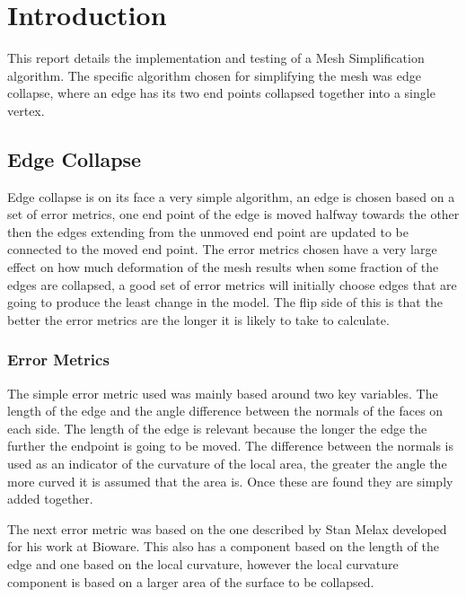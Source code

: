 \chapter{Introduction}

  This report details the implementation and testing of a Mesh Simplification
  algorithm.  The specific algorithm chosen for simplifying the mesh was edge
  collapse, where an edge has its two end points collapsed together into a
  single vertex.

  \section{Edge Collapse}

    Edge collapse is on its face a very simple algorithm, an edge is chosen
    based on a set of error metrics, one end point of the edge is moved halfway
    towards the other then the edges extending from the unmoved end point are
    updated to be connected to the moved end point.  The error metrics chosen
    have a very large effect on how much deformation of the mesh results when
    some fraction of the edges are collapsed, a good set of error metrics will
    initially choose edges that are going to produce the least change in the
    model.  The flip side of this is that the better the error metrics are the
    longer it is likely to take to calculate.

    \subsection{Error Metrics}

      The simple error metric used was mainly based around two key variables.
      The length of the edge and the angle difference between the normals of the
      faces on each side.  The length of the edge is relevant because the longer
      the edge the further the endpoint is going to be moved.  The difference
      between the normals is used as an indicator of the curvature of the local
      area, the greater the angle the more curved it is assumed that the area
      is.  Once these are found they are simply added together.

      The next error metric was based on the one described by Stan Melax
      \cite{smelax} developed for his work at Bioware.  This also has a
      component based on the length of the edge and one based on the local
      curvature, however the local curvature component is based on a larger
      area of the surface to be collapsed.
